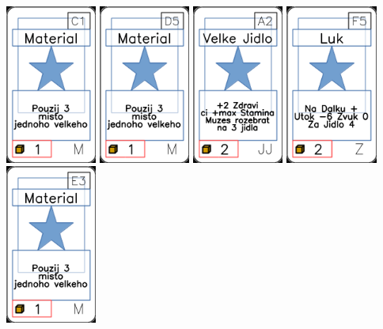 \documentclass[a4paper]{article}
\begin{document}
	\includegraphics[width=3.0cm]{img-1_40}
	\includegraphics[width=3.0cm]{img-1_49}
	\includegraphics[width=3.0cm]{img-1_31}
	\includegraphics[width=3.0cm]{img-1_89}
	\includegraphics[width=3.0cm]{img-1_52}
\end{document}
